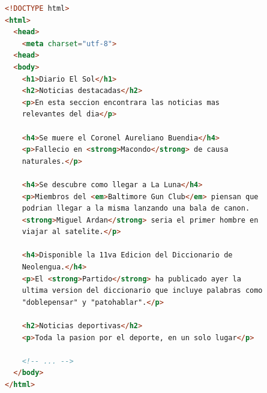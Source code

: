 \documentclass[12pt, addpoints]{../../common/epyl_exam_template}
\begin{document}
\begin{questions}
\begin{parts}

    \begin{solution}
      \begin{lstlisting}[language=HTML]
<!DOCTYPE html>
<html>
  <head>
    <meta charset="utf-8">
  <head>
  <body>
    <h1>Diario El Sol</h1>
    <h2>Noticias destacadas</h2>
    <p>En esta seccion encontrara las noticias mas
    relevantes del dia</p>

    <h4>Se muere el Coronel Aureliano Buendia</h4>
    <p>Fallecio en <strong>Macondo</strong> de causa
    naturales.</p>

    <h4>Se descubre como llegar a La Luna</h4>
    <p>Miembros del <em>Baltimore Gun Club</em> piensan que
    podrian llegar a la misma lanzando una bala de canon.
    <strong>Miguel Ardan</strong> seria el primer hombre en
    viajar al satelite.</p>

    <h4>Disponible la 11va Edicion del Diccionario de
    Neolengua.</h4>
    <p>El <strong>Partido</strong> ha publicado ayer la
    ultima version del diccionario que incluye palabras como
    "doblepensar" y "patohablar".</p>

    <h2>Noticias deportivas</h2>
    <p>Toda la pasion por el deporte, en un solo lugar</p>

    <!-- ... -->
  </body>
</html>
    \end{lstlisting}
  \end{solution}


\end{parts}
\end{questions}
\end{document}
